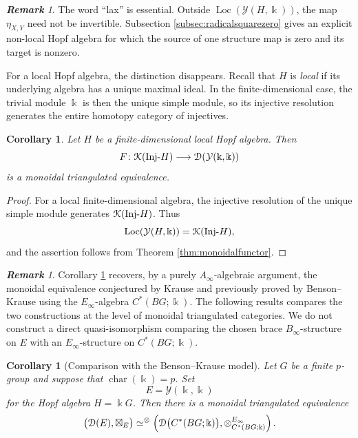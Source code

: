 \documentclass[a4paper, 11pt]{amsart}
\newtheorem{cor}[thm]{Corollary}
\theoremstyle{definition}
\theoremstyle{remark}
\newtheorem{rem}[thm]{\bf Remark}
\numberwithin{equation}{section}
\newcommand{\Y}{\mathcal{Y}}
\newcommand{\ED}{\EuScript{D}}
\newcommand{\EK}{\EuScript{K}}
\begin{document}
\begin{rem}
The word ``lax'' is essential. Outside $\operatorname{Loc}(\Y(H,\Bbbk))$, the map $\eta_{X,Y}$ need not be invertible. Subsection \ref{subsec:radicalsquarezero} gives an explicit non-local Hopf algebra for which the source of one structure map is zero and its target is nonzero.
\end{rem}

For a local Hopf algebra, the distinction disappears. Recall that $H$ is \emph{local} if its underlying algebra has a unique maximal ideal. In the finite-dimensional case, the trivial module $\Bbbk$ is then the unique simple module, so its injective resolution generates the entire homotopy category of injectives.
\begin{cor}\label{cor:tensor-triangle}
Let $H$ be a finite-dimensional local Hopf algebra. Then
\[
F\colon\EK(\mathrm{Inj}\text{-}H)\longrightarrow\ED(\Y(\Bbbk,\Bbbk))
\]
is a monoidal triangulated equivalence.
\end{cor}
\begin{proof}
For a local finite-dimensional algebra, the injective resolution of the unique simple module generates $\EK(\mathrm{Inj}\text{-}H)$. Thus
\[
\operatorname{Loc}(\Y(H,\Bbbk))=\EK(\mathrm{Inj}\text{-}H),
\]
and the assertion follows from Theorem \ref{thm:monoidalfunctor}.
\end{proof}

\begin{rem}
 Corollary \ref{cor:tensor-triangle} recovers, by a purely
$A_\infty$-algebraic argument, the monoidal equivalence conjectured
by Krause and previously proved by Benson--Krause using the
$E_\infty$-algebra $C^*(BG;\Bbbk)$. The following results compares the two constructions at
the level of monoidal triangulated categories. We do not construct a direct quasi-isomorphism comparing the chosen brace
$B_\infty$-structure on $E$ with an $E_\infty$-structure on
$C^*(BG;\Bbbk)$. 
\end{rem}

\begin{cor}[Comparison with the Benson--Krause model]
\label{cor:BKcomparison}
Let $G$ be a finite $p$-group and suppose that
$\operatorname{char}(\Bbbk)=p$. Set
\[
E=\Y(\Bbbk,\Bbbk)
\]
for the Hopf algebra $H=\Bbbk G$. Then there is a monoidal
triangulated equivalence
\[
\bigl(\ED(E),\boxtimes_E\bigr)
\simeq^\otimes
\left(
\ED\bigl(C^*(BG;\Bbbk)\bigr),
\otimes^{E_\infty}_{C^*(BG;\Bbbk)}
\right).
\]
\end{cor}
\end{document}
